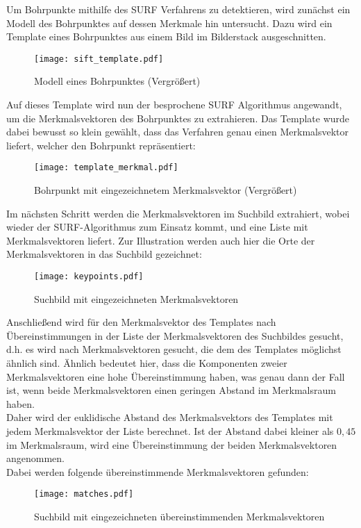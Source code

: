 Um Bohrpunkte mithilfe des SURF Verfahrens zu detektieren, wird zunächst ein Modell des Bohrpunktes auf dessen Merkmale hin untersucht. Dazu wird ein Template eines Bohrpunktes aus einem Bild im Bilderstack ausgeschnitten.
\begin{figure}[H]
  \begin{center}
    \texttt{[image: sift\_template.pdf]}
    \caption{Modell eines Bohrpunktes (Vergrößert)}
    \label{fig:sift_template}
  \end{center}
\end{figure}


Auf dieses Template wird nun der besprochene SURF Algorithmus angewandt, um die Merkmalsvektoren des Bohrpunktes zu extrahieren.
Das Template wurde dabei bewusst so klein gewählt, dass das Verfahren genau einen Merkmalsvektor liefert, welcher den Bohrpunkt repräsentiert:
\begin{figure}[H]
  \begin{center}
    \texttt{[image: template\_merkmal.pdf]}
    \caption{Bohrpunkt mit eingezeichnetem Merkmalsvektor (Vergrößert)}
    \label{fig:template_merkmal}
  \end{center}
\end{figure}

Im nächsten Schritt werden die Merkmalsvektoren im Suchbild extrahiert, wobei wieder der SURF-Algorithmus zum Einsatz kommt, und eine Liste mit Merkmalsvektoren liefert. Zur Illustration werden auch hier die Orte der Merkmalsvektoren in das Suchbild gezeichnet:
\begin{figure}[H]
  \begin{center}
    \texttt{[image: keypoints.pdf]}
    \caption{Suchbild mit eingezeichneten Merkmalsvektoren}
    \label{fig:suchbild_merkmal}
  \end{center}
\end{figure}

Anschließend wird für den Merkmalsvektor des Templates nach Übereinstimmungen in der Liste der Merkmalsvektoren des Suchbildes gesucht, d.h. es wird nach Merkmalsvektoren gesucht, die dem des Templates möglichst ähnlich sind. Ähnlich bedeutet hier, dass die Komponenten zweier Merkmalsvektoren eine hohe Übereinstimmung haben, was genau dann der Fall ist, wenn beide Merkmalsvektoren einen geringen Abstand im Merkmalsraum haben. \\
Daher wird der euklidische Abstand des Merkmalsvektors des Templates mit jedem Merkmalsvektor der Liste berechnet. Ist der Abstand dabei kleiner als $0,45$ im Merkmalsraum, wird eine Übereinstimmung der beiden Merkmalsvektoren angenommen.\\
Dabei werden folgende übereinstimmende Merkmalsvektoren gefunden:
\begin{figure}[H]
  \begin{center}
    \texttt{[image: matches.pdf]}
    \caption{Suchbild mit eingezeichneten übereinstimmenden Merkmalsvektoren}
    \label{fig:suchbild_merkmal_matches}
  \end{center}
\end{figure}

